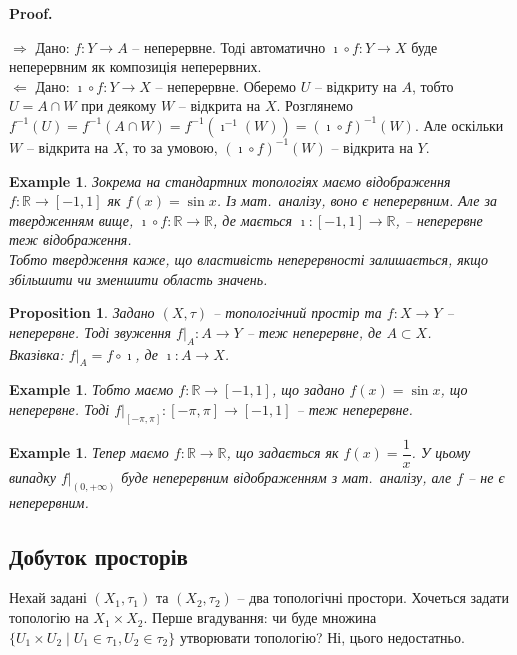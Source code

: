 \documentclass[a4paper, 10pt]{article}
\makeatletter
\def\rightproof{$\boxed{\Rightarrow}$ }
\def\leftproof{$\boxed{\Leftarrow}$ }
\theoremstyle{theoremdd}
\newtheorem{example}[theorem]{Example}
\newtheorem{proposition}[theorem]{Proposition}
\renewenvironment{proof}[1][Proof.\\]{\par
\pushQED{\hfill \qed}%
\normalfont \topsep6\p@\@plus6\p@\relax
\trivlist
\item\relax
{\bfseries
#1\@addpunct{.}}\hspace\labelsep\ignorespaces
}{%
\popQED\endtrivlist\@endpefalse
}
\makeatother
\begin{document}
\begin{proof}
\rightproof Дано: $f \colon Y \to A$ -- неперервне. Тоді автоматично $\imath \circ f \colon Y \to X$ буде неперервним як композиція неперервних.
\bigskip \\
\leftproof Дано: $\imath \circ f \colon Y \to X$ -- неперервне. Оберемо $U$ -- відкриту на $A$, тобто $U = A \cap W$ при деякому $W$ -- відкрита на $X$. Розглянемо $f^{-1}(U) = f^{-1}(A \cap W) = f^{-1}(\imath^{-1}(W)) = (\imath \circ f)^{-1}(W)$. Але оскільки $W$ -- відкрита на $X$, то за умовою, $(\imath \circ f)^{-1}(W)$ -- відкрита на $Y$.
\end{proof}

\begin{example}
Зокрема на стандартних топологіях маємо відображення $f \colon \mathbb{R} \to [-1,1]$ як $f(x) = \sin x$. Із мат.\ аналізу, воно є неперервним. Але за твердженням вище, $\imath \circ f \colon \mathbb{R} \to \mathbb{R}$, де мається $\imath \colon [-1,1] \to \mathbb{R}$, -- неперервне теж відображення.\\
Тобто твердження каже, що властивість неперервності залишається, якщо збільшити чи зменшити область значень.
\end{example}

\begin{proposition}
Задано $(X,\tau)$ -- топологічний простір та $f \colon X \to Y$ -- неперервне. Тоді звуження $f \Big|_A \colon A \to Y$ -- теж неперервне, де $A \subset X$.\\
\textit{Вказівка: $f \Big|_A = f \circ \imath$, де $\imath \colon A \to X$.}
\end{proposition}

\begin{example}
Тобто маємо $f \colon \mathbb{R} \to [-1,1]$, що задано $f(x) = \sin x$, що неперервне. Тоді $f \Big|_{[-\pi,\pi]} \colon [-\pi,\pi] \to [-1,1]$ -- теж неперервне.
\end{example}

\begin{example}
Тепер маємо $f \colon \mathbb{R} \to \mathbb{R}$, що задається як $f(x) = \dfrac{1}{x}$. У цьому випадку $f \Big|_{(0,+\infty)}$ буде неперервним відображенням з мат.\ аналізу, але $f$ -- не є неперервним.
\end{example}

\subsection{Добуток просторів}
Нехай задані $(X_1,\tau_1)$ та $(X_2,\tau_2)$ -- два топологічні простори. Хочеться задати топологію на $X_1 \times X_2$. Перше вгадування: чи буде множина $\{U_1 \times U_2 \mid U_1 \in \tau_1, U_2 \in \tau_2\}$ утворювати топологію? Ні, цього недостатньо.
\end{document}
